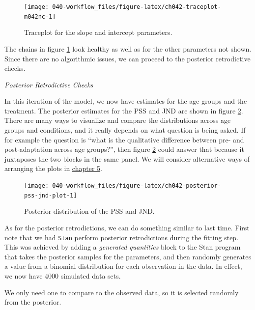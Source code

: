 \documentclass[11pt, oneside, openany]{scrbook}
\begin{document}
\begin{figure}

{\centering \texttt{[image: 040-workflow\_files/figure-latex/ch042-traceplot-m042nc-1]} 

}

\caption{Traceplot for the slope and intercept parameters.}\label{fig:ch042-traceplot-m042nc}
\end{figure}

The chains in figure \ref{fig:ch042-traceplot-m042nc} look healthy as well as for the other parameters not shown. Since there are no algorithmic issues, we can proceed to the posterior retrodictive checks.

\emph{Posterior Retrodictive Checks}

In this iteration of the model, we now have estimates for the age groups and the treatment. The posterior estimates for the PSS and JND are shown in figure \ref{fig:ch042-posterior-pss-jnd-plot}. There are many ways to visualize and compare the distributions across age groups and conditions, and it really depends on what question is being asked. If for example the question is ``what is the qualitative difference between pre- and post-adaptation across age groups?'', then figure \ref{fig:ch042-posterior-pss-jnd-plot} could answer that because it juxtaposes the two blocks in the same panel. We will consider alternative ways of arranging the plots in \protect\hyperlink{results}{chapter 5}.

\begin{figure}

{\centering \texttt{[image: 040-workflow\_files/figure-latex/ch042-posterior-pss-jnd-plot-1]} 

}

\caption{Posterior distribution of the PSS and JND.}\label{fig:ch042-posterior-pss-jnd-plot}
\end{figure}

As for the posterior retrodictions, we can do something similar to last time. First note that we had \texttt{Stan} perform posterior retrodictions during the fitting step. This was achieved by adding a \emph{generated quantities} block to the Stan program that takes the posterior samples for the parameters, and then randomly generates a value from a binomial distribution for each observation in the data. In effect, we now have \(4000\) simulated data sets.

We only need one to compare to the observed data, so it is selected randomly from the posterior.
\end{document}
